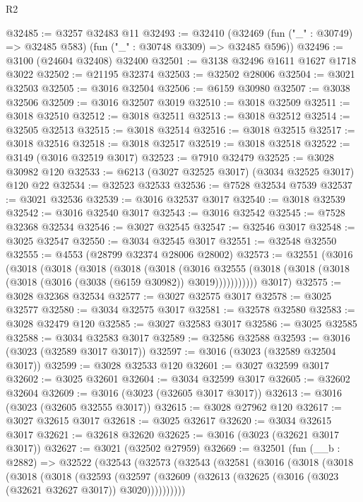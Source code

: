 \begin{lexlean}{R2}
\begin{coremodule}
@32485 := @3257 @32483 @11
@32493 := @32410
    (@32469 (fun ("_" : @30749) => @32485 @583) (fun ("_" : @30748 @3309) => @32485 @596))
@32496 := @3100 (@24604 @32408) @32400
@32501 := @3138 @32496 @1611 @1627 @1718 @3022
@32502 := @21195 @32374
@32503 := @32502 @28006
@32504 := @3021 @32503
@32505 := @3016 @32504
@32506 := @6159 @30980
@32507 := @3038 @32506
@32509 := @3016 @32507 @3019
@32510 := @3018 @32509
@32511 := @3018 @32510
@32512 := @3018 @32511
@32513 := @3018 @32512
@32514 := @32505 @32513
@32515 := @3018 @32514
@32516 := @3018 @32515
@32517 := @3018 @32516
@32518 := @3018 @32517
@32519 := @3018 @32518
@32522 := @3149 (@3016 @32519 @3017)
@32523 := @7910 @32479
@32525 := @3028 @30982 @120
@32533 := @6213 (@3027 @32525 @3017) (@3034 @32525 @3017) @120 @22
@32534 := @32523 @32533
@32536 := @7528 @32534 @7539
@32537 := @3021 @32536
@32539 := @3016 @32537 @3017
@32540 := @3018 @32539
@32542 := @3016 @32540 @3017
@32543 := @3016 @32542
@32545 := @7528 @32368 @32534
@32546 := @3027 @32545
@32547 := @32546 @3017
@32548 := @3025 @32547
@32550 := @3034 @32545 @3017
@32551 := @32548 @32550
@32555 := @4553 (@28799 @32374 @28006 @28002)
@32573 := @32551
    (@3016
      (@3018
        (@3018
          (@3018
            (@3018
              (@3018
                (@3016
                  @32555
                  (@3018 (@3018 (@3018 (@3018 (@3016 (@3038 (@6159 @30982)) @3019)))))))))))
      @3017)
@32575 := @3028 @32368 @32534
@32577 := @3027 @32575 @3017
@32578 := @3025 @32577
@32580 := @3034 @32575 @3017
@32581 := @32578 @32580
@32583 := @3028 @32479 @120
@32585 := @3027 @32583 @3017
@32586 := @3025 @32585
@32588 := @3034 @32583 @3017
@32589 := @32586 @32588
@32593 := @3016 (@3023 (@32589 @3017 @3017))
@32597 := @3016 (@3023 (@32589 @32504 @3017))
@32599 := @3028 @32533 @120
@32601 := @3027 @32599 @3017
@32602 := @3025 @32601
@32604 := @3034 @32599 @3017
@32605 := @32602 @32604
@32609 := @3016 (@3023 (@32605 @3017 @3017))
@32613 := @3016 (@3023 (@32605 @32555 @3017))
@32615 := @3028 @27962 @120
@32617 := @3027 @32615 @3017
@32618 := @3025 @32617
@32620 := @3034 @32615 @3017
@32621 := @32618 @32620
@32625 := @3016 (@3023 (@32621 @3017 @3017))
@32627 := @3021 (@32502 @27959)
@32669 := @32501
    (fun (__b : @2882) =>
    @32522
      (@32543
        (@32573
          (@32543
            (@32581
              (@3016
                (@3018
                  (@3018
                    (@3018
                      (@3018
                        (@32593
                          (@32597
                            (@32609
                              (@32613 (@32625 (@3016 (@3023 (@32621 @32627 @3017)) @3020))))))))))

\end{coremodule}
\end{lexlean}
